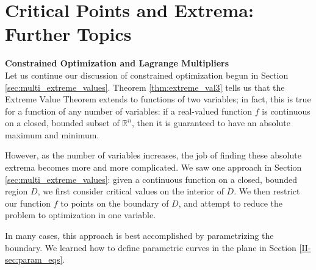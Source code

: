 \section{Critical Points and Extrema: Further Topics}\label{sec:multi_extreme_further}

\noindent\textbf{\large Constrained Optimization and Lagrange Multipliers}\\

Let us continue our discussion of constrained optimization begun in Section \ref{sec:multi_extreme_values}. Theorem \ref{thm:extreme_val3} tells us that the Extreme Value Theorem extends to functions of two variables; in fact, this is true for a function of any number of variables: if a real-valued function $f$ is continuous on a closed, bounded subset of $\mathbb{R}^n$, then it is guaranteed to have an absolute maximum and minimum.

However, as the number of variables increases, the job of finding these absolute extrema becomes more and more complicated. We saw one approach in Section \ref{sec:multi_extreme_values}: given a continuous function on a closed, bounded region $D$, we first consider critical values on the interior of $D$. We then restrict our function $f$ to points on the boundary of $D$, and attempt to reduce the problem to optimization in one variable.

In many cases, this approach is best accomplished by parametrizing the boundary. We learned how to define parametric curves in the plane in Section \ref{II-sec:param_eqs}.\\

